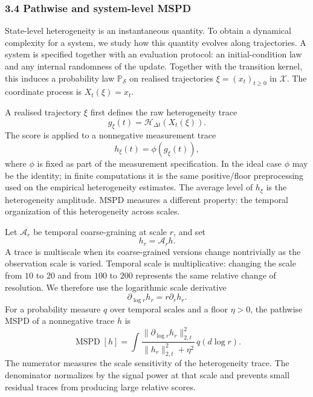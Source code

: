 \subsubsection*{3.4 Pathwise and system-level MSPD}
\label{method:pathwise-mspd}

State-level heterogeneity is an instantaneous quantity.  To obtain a dynamical complexity for a system, we study how this quantity evolves along trajectories.  A system is specified together with an evaluation protocol: an initial-condition law and any internal randomness of the update.  Together with the transition kernel, this induces a probability law \(\mathbb P_{\mathcal S}\) on realised trajectories \(\xi=(x_t)_{t\ge0}\) in \(\mathcal X\).  The coordinate process is \(X_t(\xi)=x_t\).

A realised trajectory \(\xi\) first defines the raw heterogeneity trace
\begin{equation}
g_\xi(t)=\mathcal H_{\Delta t}(X_t(\xi)).
  \label{eq:pathwise-raw-heterogeneity}
\end{equation}
The score is applied to a nonnegative measurement trace
\begin{equation}
h_\xi(t)=\phi(g_\xi(t)),
  \label{eq:pathwise-heterogeneity}
\end{equation}
where \(\phi\) is fixed as part of the measurement specification.  In the ideal case \(\phi\) may be the identity; in finite computations it is the same positive/floor preprocessing used on the empirical heterogeneity estimates.  The average level of \(h_\xi\) is the heterogeneity amplitude.  MSPD measures a different property: the temporal organization of this heterogeneity across scales.

Let \(\mathcal A_r\) be temporal coarse-graining at scale \(r\), and set
\[
  h_r=\mathcal A_rh.
\]
A trace is multiscale when its coarse-grained versions change nontrivially as the observation scale is varied.  Temporal scale is multiplicative: changing the scale from \(10\) to \(20\) and from \(100\) to \(200\) represents the same relative change of resolution.  We therefore use the logarithmic scale derivative
\[
  \partial_{\log r}h_r=r\partial_rh_r.
\]
For a probability measure \(q\) over temporal scales and a floor \(\eta>0\), the pathwise MSPD of a nonnegative trace \(h\) is
\begin{equation}
\operatorname{MSPD}[h]
  =
  \int
  \frac{
    \|\partial_{\log r}h_r\|_{2,t}^{2}
  }{
    \|h_r\|_{2,t}^{2}+\eta^2
  }
  \,q(d\log r).
  \label{eq:pathwise-mspd}
\end{equation}
The numerator measures the scale sensitivity of the heterogeneity trace.  The denominator normalizes by the signal power at that scale and prevents small residual traces from producing large relative scores.

